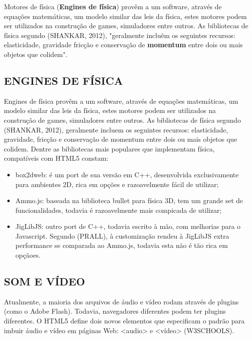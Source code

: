 \documentclass{article}
\begin{document}
Motores de física (\textbf{Engines de física}) provêm a um software, através de equações matemáticas, um modelo similar das leis da física, estes motores podem ser utilizados na construção de games, simuladores entre outros. As bibliotecas de física segundo (SHANKAR, 2012), "geralmente incluẽm os seguintes recursos: elasticidade, gravidade fricção e conservação de \textbf{momentum} entre dois ou mais objetos que colidem".


\subsection{ENGINES DE FÍSICA}

Engines de física  provêm a um software, através de equações matemáticas, um modelo similar das leis da física, estes motores podem ser utilizados na construção de games, simuladores entre outros. As bibliotecas de física segundo (SHANKAR, 2012), geralmente incluem os seguintes recursos: elasticidade, gravidade, fricção e conservação de momentum entre dois ou mais objetos que colidem.
	Dentre as bibliotecas mais populares que implementam física, compatíveis com HTML5 constam:

\begin{itemize}
    \item box2dweb: é um port de sua versão em C++, desenvolvida exclusivamente para ambientes 2D, rica em opções e razoavelmente fácil de utilizar;
    \item Ammo.js: baseada na biblioteca bullet para física 3D, tem um grande set de funcionalidades, todavia é razoavelmente mais compicada de utilizar;

    \item JigLibJS: outro port de C++, todavia escrito à mão, com melhorias para o Javascript.  Segundo (PRALL), à customização rendeu à JigLibJS extra performance se comparada ao Ammo.js, todavia esta não é tão rica em opçãoes.
\end{itemize}


\subsection{SOM E VÍDEO}

Atualmente, a maioria dos arquivos de áudio e vídeo rodam através de plugins (como o Adobe Flash). Todavia, navegadores diferentes podem ter plugins diferentes. O HTML5 define dois novos elementos que especificam o padrão para imbuir áudio e vídeo em páginas Web: <audio> e <vídeo> (W3SCHOOLS).
\end{document}
